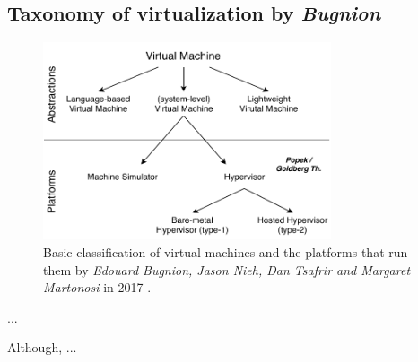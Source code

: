 	\subsection{Taxonomy of virtualization by \textit{Bugnion}}
	
	\begin{figure}[H]
		\centering
		\includegraphics[width=8.5cm]{images/Bugnion2017.pdf}
		\vspace{-0.2cm}
		\caption{Basic classification of virtual machines and the platforms that run them by \textit{Edouard Bugnion, Jason Nieh, Dan Tsafrir and Margaret Martonosi} in 2017 \cite{Bugnion2017}.}
		\label{fig:TaxonomyOfVirtualizationBugnion}
	\end{figure}
	
    ...
    
    Although,  ...
  

